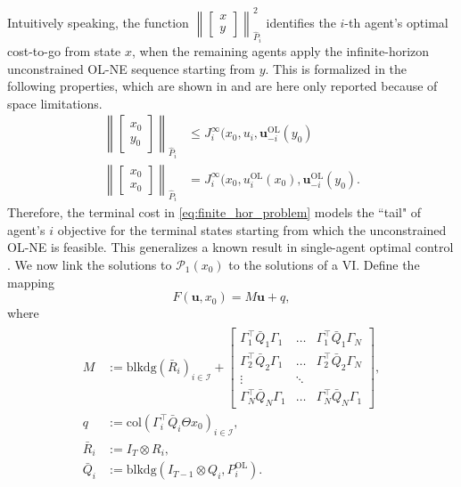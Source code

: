 \documentclass[letterpaper, 10 pt, conference]{ieeeconf}  %
\newcommand{\mc}{\mathcal}
\newcommand{\col}{\mathrm{col}}
\newcommand{\buol}{\boldsymbol{u}^{\mathrm{OL}}}
\newcommand{\uol}{u^{\mathrm{OL}}}
\newcommand{\Pol}{P^{\mathrm{OL}}}
\newcommand{\bu}{\boldsymbol{u}}
\newcommand{\blkdiag}{\mathrm{blkdg}}
\begin{document}
Intuitively speaking, the function $\left\| \begin{bmatrix}
    x\\ y
\end{bmatrix} \right\|^2_{\hat{P}_i}$ identifies the $i$-th agent's optimal cost-to-go from state $x$, when the remaining agents apply the infinite-horizon unconstrained OL-NE sequence starting from $y$. This is formalized in the following properties, which are shown in \cite[\S 3B]{benenati2024linear} and are here only reported because of space limitations.
\begin{subequations}
    \begin{align}
        \left\|\begin{bmatrix}
            x_0 \\ y_0
        \end{bmatrix} \right\|_{\hat{P}_i} & \leq J_i^{\infty}(x_0, u_i, \buol_{-i}(y_0) \\
        \left\|\begin{bmatrix}
            x_0 \\ x_0
        \end{bmatrix} \right\|_{\hat{P}_i} &= J_i^{\infty}(x_0, \uol_i(x_0), \buol_{-i}(y_0).
    \end{align}
\end{subequations}
Therefore, the terminal cost in \eqref{eq:finite_hor_problem} models the ``tail" of agent's $i$ objective for the terminal states starting from which the unconstrained OL-NE is feasible. This  generalizes a known result in single-agent optimal control \cite{..}. We now link the solutions to $\mc P_1(x_0)$ to the solutions of a VI. Define the mapping 
\begin{equation} \label{eq:def_F}
        F(\bu, x_0) = M\bu + q,
    \end{equation}
    where
    \begin{align}\label{eq:def_VI_matrices}
    \begin{split}
        M&:= \mathrm{blkdg}(\bar{R}_i)_{i\in\mc I} + \begin{bmatrix}
            \Gamma_1^\top\bar{Q}_1\Gamma_1 & \dots &\Gamma_1^\top\bar{Q}_1\Gamma_N \\
            \Gamma_2^\top\bar{Q}_2\Gamma_1 & \dots & \Gamma_2^\top\bar{Q}_2\Gamma_N \\
            \vdots & \ddots & \\
            \Gamma_N^\top\bar{Q}_N\Gamma_1 & \dots & \Gamma_N^\top\bar{Q}_N\Gamma_1 
        \end{bmatrix}, \\
        q&:= \col(\Gamma_i^{\top}\bar{Q}_i\Theta x_0)_{i\in\mc I},\\
        \bar{R}_i&:= I_T\otimes R_i, \\
        \bar{Q}_i&:= \blkdiag(I_{T-1}\otimes Q_i, \Pol_i).
    \end{split}
    \end{align}
\end{document}
